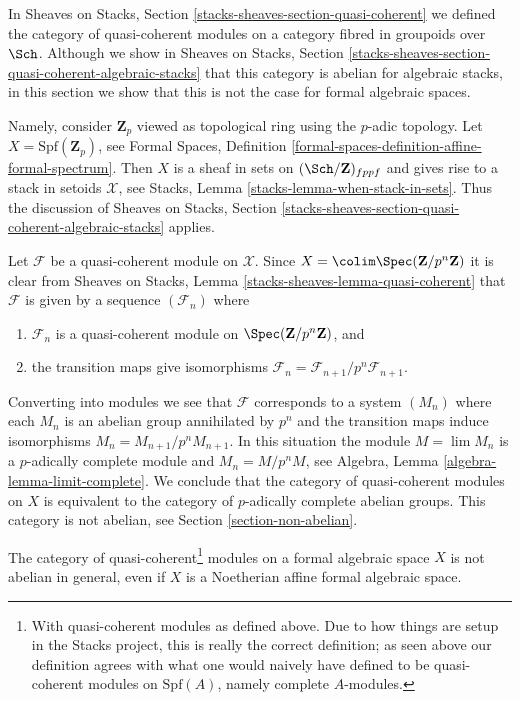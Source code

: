 \noindent
In Sheaves on Stacks, Section \ref{stacks-sheaves-section-quasi-coherent}
we defined the category of quasi-coherent modules on a category fibred in
groupoids over $\Sch$. Although we show in
Sheaves on Stacks, Section
\ref{stacks-sheaves-section-quasi-coherent-algebraic-stacks}
that this category is abelian for algebraic stacks, in this
section we show that this is not the case for formal algebraic spaces.

\medskip\noindent
Namely, consider $\mathbf{Z}_p$ viewed as topological ring using
the $p$-adic topology. Let $X = \text{Spf}(\mathbf{Z}_p)$, see
Formal Spaces, Definition
\ref{formal-spaces-definition-affine-formal-spectrum}.
Then $X$ is a sheaf in sets on $(\Sch/\mathbf{Z})_{fppf}$
and gives rise to a stack in setoids $\mathcal{X}$, see 
Stacks, Lemma \ref{stacks-lemma-when-stack-in-sets}.
Thus the discussion of Sheaves on Stacks, Section
\ref{stacks-sheaves-section-quasi-coherent-algebraic-stacks}
applies. 

\medskip\noindent
Let $\mathcal{F}$ be a quasi-coherent module on $\mathcal{X}$.
Since $X = \colim \Spec(\mathbf{Z}/p^n\mathbf{Z})$ it is clear from
Sheaves on Stacks, Lemma \ref{stacks-sheaves-lemma-quasi-coherent}
that $\mathcal{F}$ is given by a sequence $(\mathcal{F}_n)$ where
\begin{enumerate}
\item $\mathcal{F}_n$ is a quasi-coherent module on
$\Spec(\mathbf{Z}/p^n\mathbf{Z})$, and
\item the transition maps give isomorphisms
$\mathcal{F}_n = \mathcal{F}_{n + 1}/p^n\mathcal{F}_{n + 1}$.
\end{enumerate}
Converting into modules we see that $\mathcal{F}$ corresponds to a
system $(M_n)$ where each $M_n$ is an abelian group annihilated
by $p^n$ and the transition maps induce isomorphisms
$M_n = M_{n + 1}/p^n M_{n + 1}$. In this situation the module
$M = \lim M_n$ is a $p$-adically complete module and $M_n = M/p^n M$, see
Algebra, Lemma \ref{algebra-lemma-limit-complete}.
We conclude that the category of quasi-coherent modules on $X$
is equivalent to the category of $p$-adically complete
abelian groups. This category is not abelian, see
Section \ref{section-non-abelian}.

\begin{lemma}
\label{lemma-quasi-coherent-not-abelian}
The category of quasi-coherent\footnote{With quasi-coherent modules
as defined above. Due to how things are setup in the Stacks project,
this is really the correct definition; as seen above our definition
agrees with what one would naively have defined to be quasi-coherent modules
on $\text{Spf}(A)$, namely complete $A$-modules.}
modules on a formal algebraic space
$X$ is not abelian in general, even if $X$ is a Noetherian affine
formal algebraic space.
\end{lemma}

